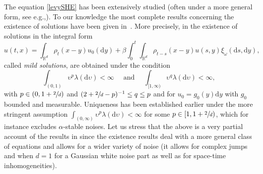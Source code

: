 \documentclass[11pt]{article}
\newcommand{\eg}{e.g.,\xspace}
\numberwithin{equation}{section}
\theoremstyle{definition}
\newcommand{\dd}{\mathrm{d}}
\newcommand{\bbR}{{\ensuremath{\mathbb R}} }
\let\ga\alpha
\let\gl\lambda
\let\ups\upsilon
\let\go\omega
\begin{document}
The equation \eqref{levySHE} has been extensively studied (often under a more general form, see \eg \cite{Mueller98, Loubert98}). To our knowledge the most complete results concerning the existence of solutions have been given in~\cite{Chong17}.
More precisely, in \cite{Chong17} the existence of solutions in the integral form
\begin{equation}\label{integralz}
u(t,x)= \int_{\bbR^d} \rho_{t}(x-y) u_0(\dd y) +\beta \int^t_0\int_{\bbR^d} \rho_{t-s}(x-y) u(s,y)
\xi_{\go}(\dd s, \dd y),
\end{equation}
called \textit{mild solutions},
are obtained under the condition
\begin{equation}\label{hypochong}
\int_{(0,1)} \ups^p \gl(\dd\ups)<\infty \quad \text{ and } \quad \int_{[1,\infty)} \ups^q \gl(\dd\ups)<\infty,
\end{equation}
with $p\in (0,1+\sfrac2d)$ and $ (2+\sfrac{2}{d}-p)^{-1} \le q\le p$ and for $u_0=g_0(y) \dd y$ with $g_0$ bounded and measurable.
Uniqueness has been established earlier \cite{Loubert98} under the more stringent assumption
$\int_{(0,\infty)} \ups^p \gl(\dd\ups)<\infty$ for some $p\in [1,1+\sfrac2d)$, which for instance excludes $\ga$-stable noises.
Let us stress that the above is a very partial account of the results in \cite{Chong17} since the existence results deal with a more general class of equations and allows for a wider variety of noise (it allows for complex jumps and when $d=1$ for a Gaussian white noise part as well as for space-time inhomogeneities).
\end{document}

